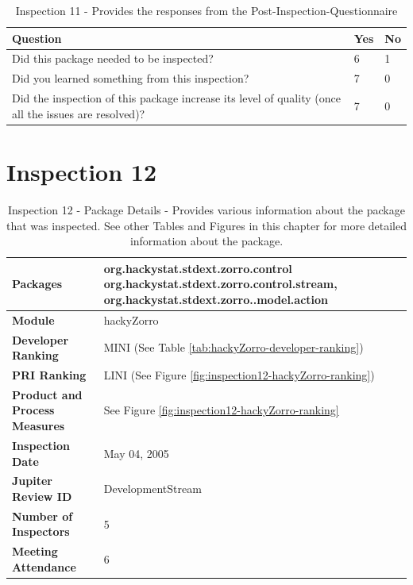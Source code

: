 \begin{table}[!h]
  \begin{center}
    \caption[Post Inspection 11 - Responses]{Inspection 11 - Provides the
      responses from the Post-Inspection-Questionnaire}
    \label{tab:post-inspection-questionnaire-results-11}
    \begin{tabular}{|p{8.0cm}|p{2.5cm}|p{2.5cm}|} \hline
{\bf Question} & {\bf Yes} & {\bf No} \\ \hline
Did this package needed to be inspected?  & 6 & 1 \\ \hline
Did you learned something from this inspection?  & 7 & 0 \\ \hline
Did the inspection of this package increase its level of quality (once all
the issues are resolved)? & 7 & 0 \\ \hline
    \end{tabular}
  \end{center}
\end{table}


\clearpage
\section{Inspection 12}
\label{appendix:section:inspection12}

\begin{table}[!h]
  \begin{center}
    \caption[Inspection 12 - Package Details]{Inspection 12 - Package Details 
      - Provides various information about the package that was
      inspected. See other Tables and Figures in this chapter for more
      detailed information about the package.}
    \label{tab:inspection-package-details-12}
    \begin{tabular}{|p{5.0cm}|p{8.0cm}|} \hline
{\bf Packages} & org.hackystat.stdext.zorro.control \newline
org.hackystat.stdext.zorro.control.stream, \newline
org.hackystat.stdext.zorro..model.action \\ \hline
{\bf Module} & hackyZorro \\ \hline
{\bf Developer Ranking} & MINI (See Table \ref{tab:hackyZorro-developer-ranking}) \\ \hline
{\bf PRI Ranking} & LINI (See Figure \ref{fig:inspection12-hackyZorro-ranking}) \\ \hline
{\bf Product and Process Measures} & See Figure \ref{fig:inspection12-hackyZorro-ranking} \\ \hline
{\bf Inspection Date} & May 04, 2005 \\ \hline
{\bf Jupiter Review ID} & DevelopmentStream \\ \hline
{\bf Number of Inspectors} & 5 \\ \hline
{\bf Meeting Attendance} & 6 \\ \hline
    \end{tabular}
  \end{center}
\end{table}


